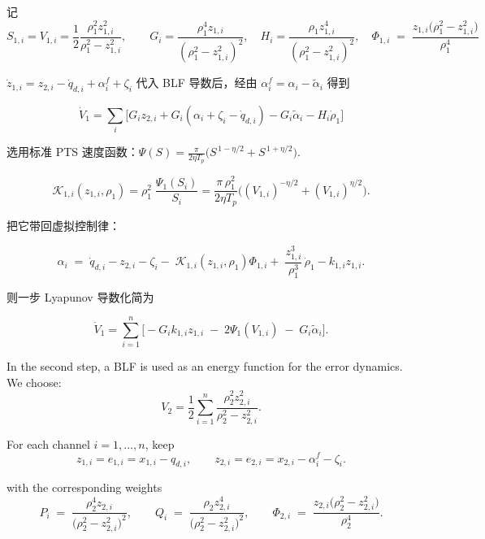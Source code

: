 \documentclass[pdflatex,sn-mathphys-num]{sn-jnl}%
\theoremstyle{thmstyleone}%
\theoremstyle{thmstyletwo}%
\theoremstyle{thmstylethree}%
\begin{document}
记
$$
S_{1,i} = V_{1,i}=\frac{1}{2}\frac{\rho_{1}^2 z_{1,i}^2}{\rho_{1}^2-z_{1,i}^2},\qquad
G_i=\frac{\rho_{1}^4 z_{1,i}}{(\rho_{1}^2-z_{1,i}^2)^2},\quad
H_i=\frac{\rho_{1} z_{1,i}^4}{(\rho_{1}^2-z_{1,i}^2)^2},
\quad
\Phi_{1,i}\;=\;\frac{z_{1,i}\bigl(\rho_{1}^{2}-z_{1,i}^{2}\bigr)}{\rho_{1}^{4}}
$$

$\dot z_{1,i}= z_{2,i}-\dot q_{d,i}+\alpha^{f}_i+\zeta_i$ 代入 BLF 导数后，经由
$\alpha^{f}_i=\alpha_i-\tilde\alpha_i$ 得到

$$
\dot V_1=\sum_i\!\Big[G_i z_{2,i}+G_i(\alpha_i+\zeta_i-\dot q_{d,i})-G_i\tilde\alpha_i-H_i\dot\rho_{1}\Big]
$$

选用标准 PTS 速度函数：$
\Psi(S)=\frac{\pi}{2 \eta T_p}\Big(S^{\,1-\eta/2}+S^{\,1+\eta/2}\Big).
$

$$
\mathcal{K}_{1,i}(z_{1,i},\rho_{1})
=\rho_{1}^2\;\frac{\Psi_1(S_i)}{S_i}
=\frac{\pi\,\rho_{1}^2}{2\eta T_p}\Big((V_{1,i})^{-\eta/2}+(V_{1,i})^{\eta/2}\Big).
$$

把它带回虚拟控制律：

$$
\alpha_i \;=\; \dot q_{d,i}-z_{2,i}-\zeta_i
-\;\mathcal{K}_{1,i}(z_{1,i},\rho_{1})\Phi_{1,i}
+\;\frac{z_{1,i}^3}{\rho_{1}^3}\,\dot\rho_{1}-k_{1,i}z_{1,i}.
$$

则一步 Lyapunov 导数化简为

$$
\dot V_1
= \sum_{i=1}^n \Big[
-G_i k_{1,i}z_{1,i}\;-\;2\Psi_1(V_{1,i})\;-\;G_i\tilde\alpha_i
\Big].
$$


In the second step, a BLF is used as an energy function for the error dynamics. We choose:
\begin{equation}\label{eq:25}
	V_2= \frac{1}{2}\sum_{i=1}^{n} \frac{\rho_{2}^2 z_{2,i}^2}{\rho_{2}^2-z_{2,i}^2}. 
\end{equation}


For each channel $i=1,\dots,n$, keep
\[
z_{1,i}=e_{1,i}=x_{1,i}-q_{d,i},\qquad
z_{2,i}=e_{2,i}=x_{2,i}-\alpha_i^{f}-\zeta_i .
\]


with the corresponding weights
\[
P_i \;=\; \frac{\rho_{2}^4 z_{2,i}}{\bigl(\rho_{2}^{2}-z_{2,i}^{2}\bigr)^{2}},\qquad
Q_{i}\;=\;\frac{\rho_{2} z_{2,i}^{4}}{\bigl(\rho_{2}^{2}-z_{2,i}^{2}\bigr)^{2}},\qquad
\Phi_{2,i}\;=\;\frac{z_{2,i}\bigl(\rho_{2}^{2}-z_{2,i}^{2}\bigr)}{\rho_{2}^{4}} .
\]


\end{document}
